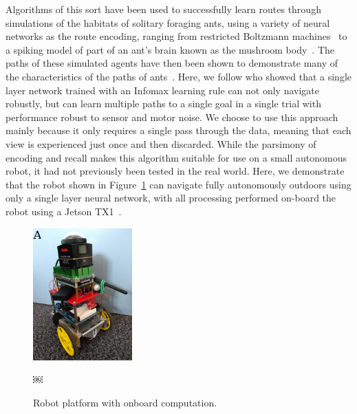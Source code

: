 \documentclass[letterpaper]{article}
\begin{document}
Algorithms of this sort have been used to successfully learn routes through simulations of the habitats of solitary foraging ants, using a variety of neural networks as the route encoding, ranging from restricted Boltzmann machines~\citep{Baddeley2011models} to a spiking model of part of an ant’s brain known as the mushroom body~\citep{Ardin2016}.
The paths of these simulated agents have then been shown to demonstrate many of the characteristics of the paths of ants~\citep{Wystrach2013}.
Here, we follow \citet{Baddeley2012} who showed that a single layer network trained with an Infomax learning rule can not only navigate robustly, but can learn multiple paths to a single goal in a single trial with performance robust to sensor and motor noise.
We choose to use this approach mainly because it only requires a single pass through the data, meaning that each view is experienced just once and then discarded.
While the parsimony of encoding and recall makes this algorithm suitable for use on a small autonomous robot, it had not previously been tested in the real world.
Here, we demonstrate that the robot shown in Figure~\ref{fig:robot} can navigate fully autonomously outdoors using only a single layer neural network, with all processing performed on-board the robot using a Jetson TX1~\citep{NVIDIACorporation2016}.

\begin{figure}[t]
    \centering
    \includegraphics[height=2in]{figures/robot.jpg}
    \caption{Robot platform with onboard computation.}￼
    \label{fig:robot}
\end{figure}
\end{document}
